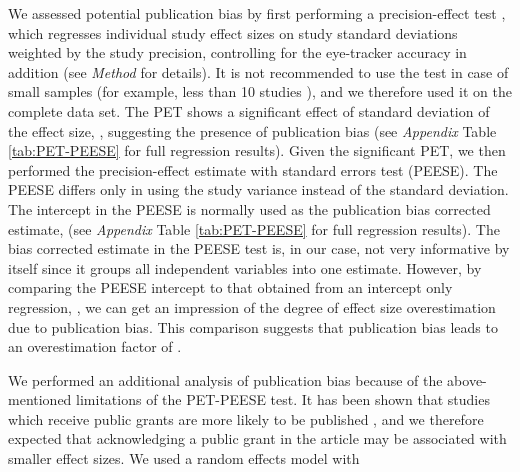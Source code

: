 We assessed potential publication bias by first performing a precision-effect test \citep[PET][]{stanley2014}, which regresses individual study effect sizes on study standard deviations weighted by the study precision, controlling for the eye-tracker accuracy in addition (see \textit{Method} for details). It is not recommended to use the test in case of small samples (for example, less than 10 studies \citep{vanaert2019}), and we therefore used it on the complete data set.  The PET shows a significant effect of standard deviation of the effect size, \unskip, suggesting the presence of publication bias (see \textit{Appendix} Table \ref{tab:PET-PEESE} for full regression results). Given the significant PET, we then performed the precision-effect estimate with standard errors test (PEESE). The PEESE differs only in using the study variance instead of the standard deviation. The intercept in the PEESE is normally used as the publication bias corrected estimate,  (see \textit{Appendix} Table \ref{tab:PET-PEESE} for full regression results). The bias corrected estimate in the PEESE test is, in our case, not very informative by itself since it groups all independent variables into one estimate. However, by comparing the PEESE intercept to that obtained from an intercept only regression, \unskip, we can get an impression of the degree of effect size overestimation due to publication bias. This comparison suggests that publication bias leads to an overestimation factor of \unskip.

We performed an additional analysis of publication bias because of the above-mentioned limitations of the PET-PEESE test. It has been shown that studies which receive public grants are more likely to be published \citep{canestaro2017}, and we therefore expected that acknowledging a public grant in the article may be associated with smaller effect sizes. We used a random effects model with 

